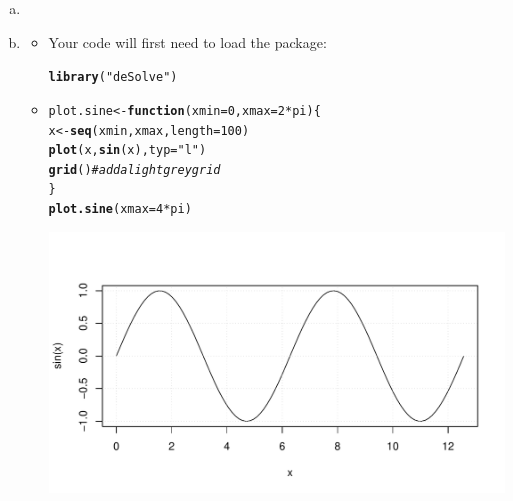 \documentclass[12pt]{article}\usepackage[]{graphicx}\usepackage[]{color}
\makeatletter
\def\maxwidth{ %
  \ifdim\Gin@nat@width>\linewidth
    \linewidth
  \else
    \Gin@nat@width
  \fi
}
\newcommand{\hlnum}[1]{\textcolor[rgb]{0.686,0.059,0.569}{#1}}%
\newcommand{\hlstr}[1]{\textcolor[rgb]{0.192,0.494,0.8}{#1}}%
\newcommand{\hlcom}[1]{\textcolor[rgb]{0.678,0.584,0.686}{\textit{#1}}}%
\newcommand{\hlopt}[1]{\textcolor[rgb]{0,0,0}{#1}}%
\newcommand{\hlstd}[1]{\textcolor[rgb]{0.345,0.345,0.345}{#1}}%
\newcommand{\hlkwa}[1]{\textcolor[rgb]{0.161,0.373,0.58}{\textbf{#1}}}%
\newcommand{\hlkwb}[1]{\textcolor[rgb]{0.69,0.353,0.396}{#1}}%
\newcommand{\hlkwc}[1]{\textcolor[rgb]{0.333,0.667,0.333}{#1}}%
\newcommand{\hlkwd}[1]{\textcolor[rgb]{0.737,0.353,0.396}{\textbf{#1}}}%
\newenvironment{kframe}{%
 \def\at@end@of@kframe{}%
 \ifinner\ifhmode%
  \def\at@end@of@kframe{\end{minipage}}%
  \begin{minipage}{\columnwidth}%
 \fi\fi%
 \def\FrameCommand##1{\hskip\@totalleftmargin \hskip-\fboxsep
 \colorbox{shadecolor}{##1}\hskip-\fboxsep
     \hskip-\linewidth \hskip-\@totalleftmargin \hskip\columnwidth}%
 \MakeFramed {\advance\hsize-\width
   \@totalleftmargin\z@ \linewidth\hsize
   \@setminipage}}%
 {\par\unskip\endMakeFramed%
 \at@end@of@kframe}
\newenvironment{knitrout}{}{} %
\makeatother
\begin{document}
\begin{enumerate}[(a)]

\item \FitSIRa

\item \FitSIRbIntro
\begin{itemize}
    \item Your code will first need to load the  package:
\begin{knitrout}
\color{fgcolor}\begin{kframe}
\begin{alltt}
\hlkwd{library}\hlstd{(}\hlstr{"deSolve"}\hlstd{)}
\end{alltt}


{\ttfamily\noindent\bfseries{}}\end{kframe}
\end{knitrout}
    \item \FitSIRbii
\begin{knitrout}
\color{fgcolor}\begin{kframe}
\begin{alltt}
\hlstd{plot.sine} \hlkwb{<-} \hlkwa{function}\hlstd{(} \hlkwc{xmin}\hlstd{=}\hlnum{0}\hlstd{,} \hlkwc{xmax}\hlstd{=}\hlnum{2}\hlopt{*}\hlstd{pi ) \{}
  \hlstd{x} \hlkwb{<-} \hlkwd{seq}\hlstd{(xmin,xmax,}\hlkwc{length}\hlstd{=}\hlnum{100}\hlstd{)}
  \hlkwd{plot}\hlstd{(x,} \hlkwd{sin}\hlstd{(x),} \hlkwc{typ}\hlstd{=}\hlstr{"l"}\hlstd{)}
  \hlkwd{grid}\hlstd{()} \hlcom{# add a light grey grid}
\hlstd{\}}
\hlkwd{plot.sine}\hlstd{(}\hlkwc{xmax}\hlstd{=}\hlnum{4}\hlopt{*}\hlstd{pi)}
\end{alltt}
\end{kframe}
\includegraphics[width=\maxwidth]{figure/plot_sine-1} 


\end{knitrout}
\end{itemize}
\end{enumerate}
\end{document}
